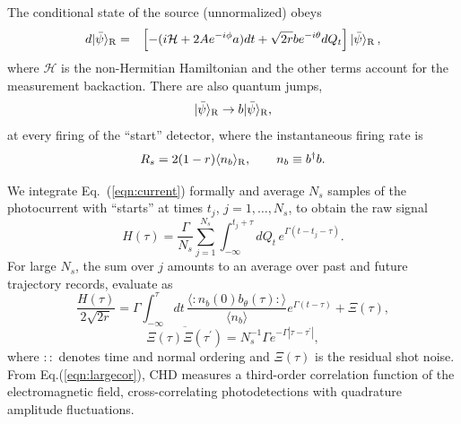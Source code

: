 \documentclass[twocolumn,aps,eqsecnum,showkeys,amsmath]{revtex4}
\newcommand{\mcH}{\mathcal{H}} 	%
\providecommand{\vxp}[1]{\langle #1 \rangle}
\providecommand{\ket}[1]{\lvert #1 \rangle}
\begin{document}
The conditional state of the source (unnormalized) obeys
%
\begin{eqnarray}
d \ket{\bar\psi}_{\rm R} &=& \left[-(i\mcH +2Ae^{-i\phi} a)dt 
	+\sqrt{2r} b e^{-i\theta}dQ_t \right] \ket{\bar\psi}_{\rm R} \,, 
	\nonumber \\ 	\label{eqn:schrodinger} 
\end{eqnarray}
where $\mcH$ is the non-Hermitian Hamiltonian and the other terms 
account for the measurement backaction. There are also quantum jumps,
%
\begin{equation}
\ket{\bar\psi}_{\rm R} \to b \ket{\bar\psi}_{\rm R},
\end{equation}
at every firing of the ``start'' detector, where the instantaneous
firing rate is
%
\begin{equation}
R_s = 2(1-r) \vxp{n_b}_{\rm R}, 	\qquad n_b\equiv b^\dagger b.
\end{equation}

We integrate Eq.\ (\ref{eqn:current}) formally and average $N_s$ 
samples of the photocurrent with ``starts'' at times $t_j$, 
$j=1,\ldots,N_s$, to obtain the raw signal
%
\begin{equation}
H(\tau) = \frac\Gamma{N_s}\sum_{j=1}^{N_s}\int_{-\infty}^{t_j+\tau}\!dQ_t\,
	e^{\Gamma(t-t_j-\tau)}.
\end{equation}
For large $N_s$, the sum over $j$ amounts to an average over past and
future trajectory records, evaluate as \cite{CCFO00}
%
\begin{equation}
\frac{H(\tau)}{2\sqrt{2r}} =
  \Gamma \int_{-\infty}^\tau dt\,\frac{ \vxp{ : n_b(0) b_\theta(\tau) :}}{\vxp{n_b}} 			e^{\Gamma(t-\tau)} +\Xi(\tau),
\label{eqn:largecor} 
\end{equation}
%
\begin{equation}
\overline{\Xi(\tau)\Xi(\tau^\prime)} 
	= N_s^{-1}\Gamma e^{-\Gamma |\tau-\tau^\prime|},
\end{equation}
where $::$ denotes time and normal ordering and $\Xi(\tau)$ is the
residual shot noise.
From Eq.(\ref{eqn:largecor}), CHD measures a third-order correlation
function of the electromagnetic field, cross-correlating 
photodetections with quadrature amplitude fluctuations.

\end{document}
